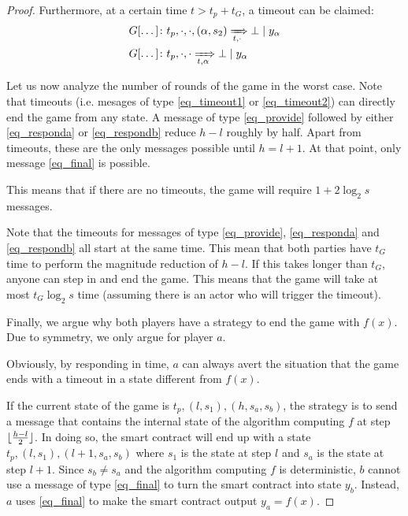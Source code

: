 \documentclass[11pt,letterpaper]{article}
\DeclarePairedDelimiter\floor{\lfloor}{\rfloor}
\begin{document}
\begin{proof}
Furthermore, at a certain time $t > t_p + t_G$, a timeout can be claimed:
\begin{align}
&G[\dots]\colon
    t_p, \cdot, \cdot, (\alpha, s_2)
    \xRightarrow[t, \cdot]{} \bot \mid y_\alpha\label{eq_timeout1}\\
&G[\dots]\colon
    t_p, \cdot, \cdot
    \xRightarrow[t, \alpha]{} \bot \mid y_\alpha\label{eq_timeout2}
\end{align}

Let us now analyze the number of rounds of the game in the worst case. Note that timeouts
(i.e. mesages of type \eqref{eq_timeout1} or \eqref{eq_timeout2}) can directly end the game from
any state.
A message of type
\eqref{eq_provide} followed by either \eqref{eq_responda} or \eqref{eq_respondb} reduce
$h-l$ roughly by half. Apart from timeouts, these are the only messages possible until
$h = l+1$. At that point, only message \eqref{eq_final} is possible.

This means that if there are no timeouts, the game will require $1 + 2 \log_2 s$ messages.

Note that the timeouts for messages of type \eqref{eq_provide}, \eqref{eq_responda} and \eqref{eq_respondb}
all start at the same time. This mean that both parties have $t_G$ time to perform the
magnitude reduction of $h-l$. If this takes longer than $t_G$, anyone can step in and end the game.
This means that the game will take at most $t_G \log_2 s$ time (assuming there is an
actor who will trigger the timeout).

Finally, we argue why both players have a strategy to end the game with $f(x)$.
Due to symmetry, we only argue for player $a$.

Obviously, by responding in time, $a$ can always avert the situation that the game
ends with a timeout in a state different from $f(x)$.

If the current state of the game is $t_p, (l, s_1), (h, s_a, s_b)$, the strategy is
to send a message that contains the internal state of the algorithm computing $f$ at step
$\floor{\frac{h-l}{2}}$. In doing so, the smart contract will end up with a state
$t_p, (l, s_1), (l+1, s_a, s_b)$ where $s_1$ is the state at step $l$ and $s_a$ is the
state at step $l+1$. Since $s_b \neq s_a$ and the algorithm computing $f$ is deterministic,
$b$ cannot use a message of type \eqref{eq_final} to turn the smart contract into
state $y_b$. Instead, $a$ uses \eqref{eq_final} to make the smart contract output $y_a = f(x)$.
\end{proof}
\end{document}
